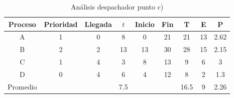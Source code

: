 \documentclass[11pt]{article}
\begin{document}
\newpage

\begin{table}[h!]
\begin{center}
      \begin{tabular}{|c|c|c|c|c|c|c|c|c|}
          \hline
          Proceso & Prioridad & Llegada & $t$ & Inicio & Fin & T & E & P \\
          \hline
          A & 1 & 0 & 8 & 0 & 21 & 21 & 13 & 2.62 \\
          \hline
          B & 2 & 2 & 13 & 13 & 30 & 28 & 15 & 2.15 \\
          \hline
          C & 1 & 4 & 3 & 8 & 13 & 9 & 6 & 3 \\
          \hline
          D & 0 & 4 & 6 & 4 & 12 & 8 & 2 & 1.3 \\
          \hline
          Promedio & & & 7.5 & & & 16.5 & 9 & 2.26 \\
          \hline
      \end{tabular}
      \caption{Análisis despachador punto c)}
\end{center}
\end{table}
\end{document}
